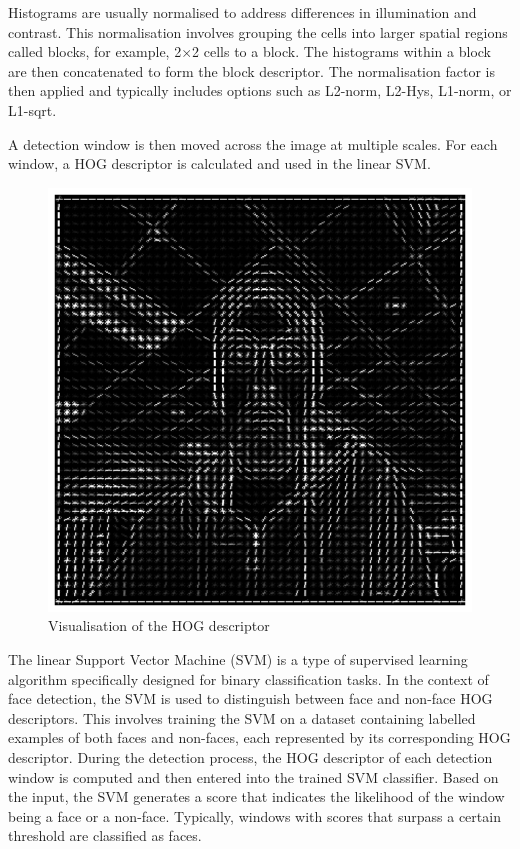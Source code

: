 Histograms are usually normalised to address differences in illumination and contrast. This normalisation involves grouping the cells into larger spatial regions called blocks, for example, 2\(\times\)2 cells to a block. The histograms within a block are then concatenated to form the block descriptor. The normalisation factor is then applied and typically includes options such as L2-norm, L2-Hys, L1-norm, or L1-sqrt.

A detection window is then moved across the image at multiple scales. For each window, a HOG descriptor is calculated and used in the linear SVM.

\begin{figure}[!htb]
    \centering{}
    \includegraphics[scale=0.35]{m+m_images/figure2_hog_descriptor_visualised_hog.png}
    \caption{Visualisation of the HOG descriptor}
    \label{figure:hogdescriptor}
\end{figure}

The linear Support Vector Machine (SVM) is a type of supervised learning algorithm specifically designed for binary classification tasks. In the context of face detection, the SVM is used to distinguish between face and non-face HOG descriptors. This involves training the SVM on a dataset containing labelled examples of both faces and non-faces, each represented by its corresponding HOG descriptor. During the detection process, the HOG descriptor of each detection window is computed and then entered into the trained SVM classifier. Based on the input, the SVM generates a score that indicates the likelihood of the window being a face or a non-face. Typically, windows with scores that surpass a certain threshold are classified as faces. \cite{1467360}

